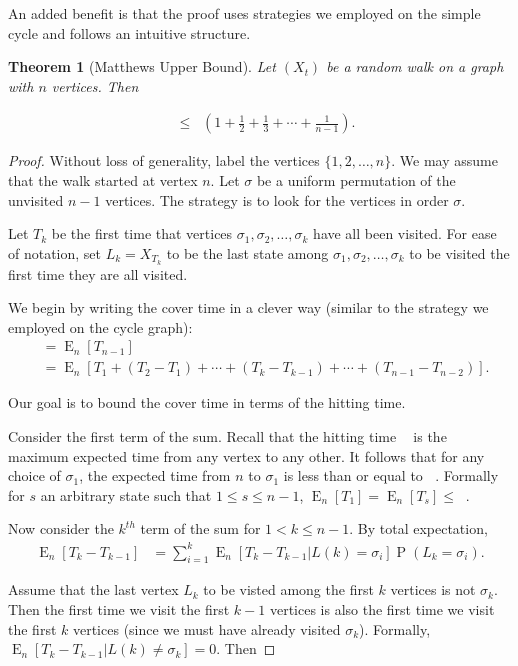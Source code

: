 \documentclass[12pt]{article}
\newtheorem{theorem}{Theorem}
\theoremstyle{definition}
\DeclareMathOperator{\E}{\mathrm{E}}		     %
\DeclareMathOperator{\pr}{\mathrm{P}}		     %
\DeclareMathOperator{\tcov}{t_\textrm{cov}}      %
\DeclareMathOperator{\hit}{t_{\textrm{hit}}}     %
\begin{document}
An added benefit is that the proof uses strategies we employed on the
simple cycle and follows an intuitive structure.

\begin{theorem}[Matthews Upper Bound]
Let $(X_t)$ be a random walk on a graph with $n$ vertices. Then \label{thm:matthews_up}
\end{theorem}
\begin{align}
\tcov &\leq \hit \left(1 + \frac{1}{2} + \frac{1}{3} + \cdots + \frac{1}{n-1} \right). \nonumber
\end{align}

\begin{proof}
Without loss of generality, label the vertices $\{1, 2, \dots, n\}$.
We may assume that the walk started at vertex $n$.
Let $\sigma$ be a uniform permutation of the unvisited $n-1$ vertices.
The strategy is to look for the vertices in order $\sigma$.

Let $T_k$ be the first time that vertices $\sigma_1, \sigma_2, \ldots, \sigma_k$
have all been visited.
For ease of notation, set $L_k = X_{T_k}$ to be the last state among 
$\sigma_1, \sigma_2, \ldots, \sigma_k$ to be visited the first
time they are all visited.

We begin by writing the cover time in a clever way
(similar to the strategy we employed on the cycle graph):
\begin{align}
\tcov &= \E_n[{T_{n-1}}]  \nonumber \\
&= \E_n[T_1 + (T_2 - T_1) + \cdots + 
(T_k - T_{k-1}) + \cdots + (T_{n-1} - T_{n-2})] . \nonumber
\end{align}

Our goal is to bound the cover time in terms of the hitting time.

Consider the first term of the sum.
Recall that the hitting time $\hit$ is the maximum
expected time from any vertex to any other.
It follows that for any choice of $\sigma_1$,
the expected time from $n$ to $\sigma_1$ is less than or equal to $\hit$.
Formally for $s$ an arbitrary state such that $1\leq s \leq n-1$,
$\E_n[T_1] = \E_n[T_s] \leq \hit$.

Now consider the $k^{th}$ term of the sum for $1 < k \leq n-1$.
By total expectation,
\begin{align}
\E_n[T_k - T_{k-1}] &=
\sum_{i=1}^k \E_n[T_k - T_{k-1} | L(k) = \sigma_i]
\pr(L_k = \sigma_i). \nonumber 
\end{align}

Assume that the last vertex $L_k$ to be visted among the first
$k$ vertices is not $\sigma_k$.
Then the first time we visit the first $k-1$ vertices
is also the first time we visit the first $k$ vertices
(since we must have already visited $\sigma_k$).
Formally, $\E_n[T_k-T_{k-1}|L(k) \neq \sigma_k] = 0$.
Then 


\end{proof}
\end{document}

